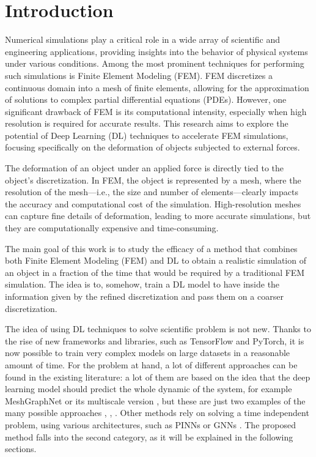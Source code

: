 \section{Introduction}

Numerical simulations play a critical role in a wide array of scientific and engineering applications, providing insights into the behavior of physical systems under various conditions. Among the most prominent techniques for performing such simulations is Finite Element Modeling (FEM). FEM discretizes a continuous domain into a mesh of finite elements, allowing for the approximation of solutions to complex partial differential equations (PDEs). However, one significant drawback of FEM is its computational intensity, especially when high resolution is required for accurate results. This research aims to explore the potential of Deep Learning (DL) techniques to accelerate FEM simulations, focusing specifically on the deformation of objects subjected to external forces.

The deformation of an object under an applied force is directly tied to the object's discretization. In FEM, the object is represented by a mesh, where the resolution of the mesh—i.e., the size and number of elements—clearly impacts the accuracy and computational cost of the simulation. High-resolution meshes can capture fine details of deformation, leading to more accurate simulations, but they are computationally expensive and time-consuming. 

The main goal of this work is to study the efficacy of a method that combines both Finite Element Modeling (FEM) and DL to obtain a realistic simulation of an object in a fraction of the time that would be required by a traditional FEM simulation. The idea is to, somehow, train a DL model to have inside the information given by the refined discretization and pass them on a coarser discretization.

The idea of using DL techniques to solve scientific problem is not new. Thanks to the rise of new frameworks and libraries, such as TensorFlow and PyTorch, it is now possible to train very complex models on large datasets in a reasonable amount of time. For the problem at hand, a lot of different approaches can be found in the existing literature: a lot of them are based on the idea that the deep learning model should predict the whole dynamic of the system, for example MeshGraphNet \cite{pfaffLearningMeshBasedSimulation2021a} or its multiscale version \cite{fortunatoMultiScaleMeshGraphNets2022}, but these are just two examples of the many possible approaches \cite{jiangMeshfreeFlowNetPhysicsConstrainedDeep2020}, \cite{djeumouNeuralNetworksPhysicsInformed2022}, \cite{hanPredictingPhysicsMeshreduced2022a}. Other methods rely on solving a time independent problem, using various architectures, such as PINNs \cite{djeumouNeuralNetworksPhysicsInformed2022} or GNNs \cite{gaoPhysicsinformedGraphNeural2022}. The proposed method falls into the second category, as it will be explained in the following sections.

